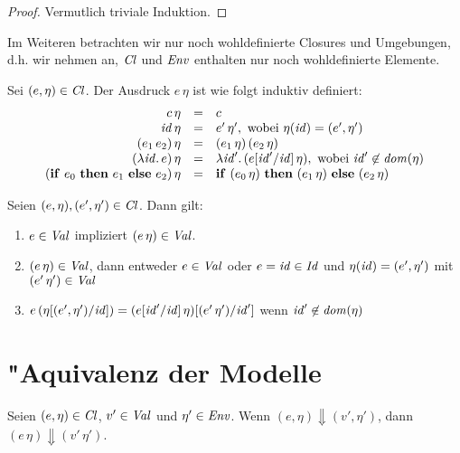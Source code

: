 \documentclass[12pt,fleqn]{article}
\newcommand{\Cl}{\name{Cl}}
\begin{document}
\begin{proof}
  Vermutlich triviale Induktion.
\end{proof}

Im Weiteren betrachten wir nur noch wohldefinierte Closures und Umgebungen, d.h. wir nehmen an,
$\Cl$ und ${\text{\it Env\/}}$ enthalten nur noch wohldefinierte Elemente.

\begin{definition} \label{definition:Substitution}
  Sei $(e,\eta) \in \Cl$. Der Ausdruck $e\,\eta$ ist wie folgt
  induktiv definiert:
  \[\begin{array}{rcl}
    c\,\eta &=& c \\
    {\text{\it id\/}}\,\eta &=& e'\,\eta', \text{ wobei } \eta({\text{\it id\/}}) = (e',\eta') \\
    (e_1\,e_2)\,\eta &=& (e_1\,\eta)\,(e_2\,\eta) \\
    (\lambda {\text{\it id\/}}.\,e)\,\eta &=& \lambda {\text{\it id\/}}'.\,(e[{\text{\it id\/}}'/{\text{\it id\/}}]\,\eta), \text{ wobei } {\text{\it id\/}}'\not\in{\text{\it dom\/}}(\eta) \\
    (\mathbf{if}\ e_0\ \mathbf{then}\ e_1\ \mathbf{else}\ e_2)\,\eta &=& \mathbf{if}\ (e_0\,\eta)\ \mathbf{then}\ (e_1\,\eta)\ \mathbf{else}\ (e_2\,\eta)
  \end{array}\]
\end{definition}

\begin{lemma} \label{lemma:Substitution}
  Seien $(e,\eta), (e',\eta') \in \Cl$. Dann gilt:
  \begin{enumerate}
    \item $e\in{\text{\it Val\/}}$ impliziert $(e\,\eta)\in{\text{\it Val\/}}$.
    \item $(e\,\eta)\in{\text{\it Val\/}}$, dann entweder $e\in{\text{\it Val\/}}$ oder
          $e={\text{\it id\/}}\in{\text{\it Id\/}}$ und $\eta({\text{\it id\/}}) = (e',\eta')$ mit $(e'\,\eta')\in{\text{\it Val\/}}$
    \item $e\,(\eta[(e',\eta')/{\text{\it id\/}}]) = (e[{\text{\it id\/}}'/{\text{\it id\/}}]\,\eta)[(e'\,\eta')/{\text{\it id\/}}']$ wenn ${\text{\it id\/}}' \not\in {\text{\it dom\/}}(\eta)$
  \end{enumerate}
\end{lemma}


\section{"Aquivalenz der Modelle}

\begin{theorem} \label{theorem:Korrektheit}
  Seien $(e,\eta) \in \Cl$, $v'\in{\text{\it Val\/}}$ und $\eta'\in{\text{\it Env\/}}$. Wenn $(e,\eta) \Downarrow (v',\eta')$, dann
  $(e\,\eta) \Downarrow (v'\,\eta')$.
\end{theorem}
\end{document}
